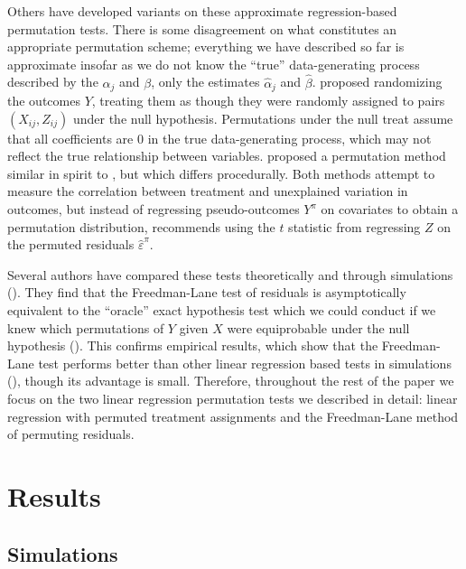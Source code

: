 \documentclass[12pt]{article}
\begin{document}
Others have developed variants on these approximate regression-based permutation tests. 
There is some disagreement on what constitutes an appropriate permutation scheme;
everything we have described so far is approximate insofar as we do not know the ``true'' data-generating process described by the $\alpha_j$ and $\beta$,
only the estimates $\hat{\alpha}_j$ and $\hat{\beta}$.
\cite{manly_randomization_2006} proposed randomizing the outcomes $Y$, treating them as though they were randomly assigned to pairs $(X_{ij}, Z_{ij})$ under the null hypothesis.
Permutations under the null treat assume that all coefficients are 0 in the true data-generating process, which may not reflect the true relationship between variables.
\cite{kennedy_randomization_1995} proposed a permutation method similar in spirit to \cite{freedman_nonstochastic_1983}, but which differs procedurally.
Both methods attempt to measure the correlation between treatment and unexplained variation in outcomes, but
instead of regressing pseudo-outcomes $Y^\pi$ on covariates to obtain a permutation distribution, \cite{kennedy_randomization_1995} recommends using the $t$ statistic from regressing $Z$ on the permuted residuals $\hat{\varepsilon}^\pi$. 

Several authors have compared these tests theoretically and through simulations (\cite{anderson_empirical_1999, anderson_permutation_2001, kennedy_randomization_1996}).
They find that the Freedman-Lane test of residuals is asymptotically equivalent to the ``oracle'' exact hypothesis test which we could conduct if we knew which permutations of $Y$ given $X$ were equiprobable under the null hypothesis (\cite{anderson_permutation_2001}).
This confirms empirical results, which show that the Freedman-Lane test performs better than other linear regression based tests in simulations (\cite{anderson_empirical_1999}), though its advantage is small.
Therefore, throughout the rest of the paper we focus on the two linear regression permutation tests we described in detail: linear regression with permuted treatment assignments and the Freedman-Lane method of permuting residuals.


\section{Results}
\subsection{Simulations}\label{simulations}
\end{document}
